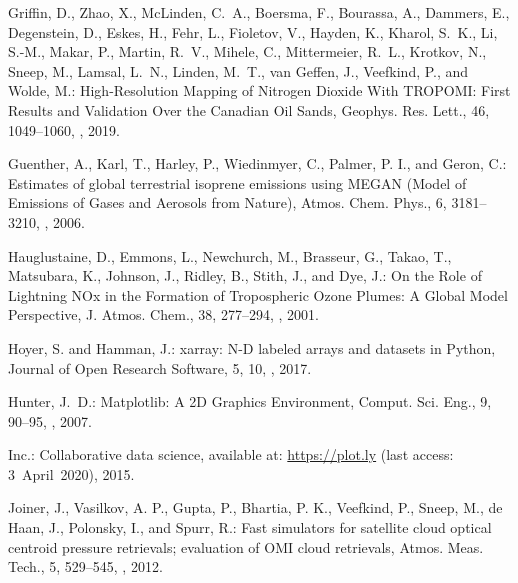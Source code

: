 \documentclass[amt]{copernicus}
\begin{document}
\begin{thebibliography}{105}
Griffin, D., Zhao, X., McLinden, C.~A., Boersma, F., Bourassa, A., Dammers, E.,
  Degenstein, D., Eskes, H., Fehr, L., Fioletov, V., Hayden, K., Kharol, S.~K.,
  Li, S.-M., Makar, P., Martin, R.~V., Mihele, C., Mittermeier, R.~L., Krotkov,
  N., Sneep, M., Lamsal, L.~N., Linden, M.~T., {van Geffen}, J., Veefkind, P.,
  and Wolde, M.: High-Resolution Mapping of Nitrogen Dioxide With TROPOMI:
  First Results and Validation Over the Canadian Oil Sands, Geophys. Res. Lett., 46, 1049--1060, , 2019.

Guenther, A., Karl, T., Harley, P., Wiedinmyer, C., Palmer, P. I., and Geron, C.: Estimates of global terrestrial isoprene emissions using MEGAN (Model of Emissions of Gases and Aerosols from Nature), Atmos. Chem. Phys., 6, 3181–3210, , 2006.

Hauglustaine, D., Emmons, L., Newchurch, M., Brasseur, G., Takao, T.,
  Matsubara, K., Johnson, J., Ridley, B., Stith, J., and Dye, J.: On the Role
  of Lightning NO{x} in the Formation of Tropospheric Ozone
  Plumes: A Global Model Perspective, J. Atmos. Chem., 38,
  277--294, , 2001.

Hoyer, S. and Hamman, J.: xarray: {N-D} labeled arrays and datasets in
  {Python}, Journal of Open Research Software, 5, 10, ,
   2017.

Hunter, J.~D.: Matplotlib: A 2D Graphics Environment,
Comput. Sci. Eng., 9, 90--95, , 2007.

Inc.: Collaborative data science, available at: \url{https://plot.ly} (last access: 3~April~2020), 2015.



Joiner, J., Vasilkov, A. P., Gupta, P., Bhartia, P. K., Veefkind, P., Sneep, M., de Haan, J., Polonsky, I., and Spurr, R.: Fast simulators for satellite cloud optical centroid pressure retrievals; evaluation of OMI cloud retrievals, Atmos. Meas. Tech., 5, 529–545, , 2012.


\end{thebibliography}
\end{document}
